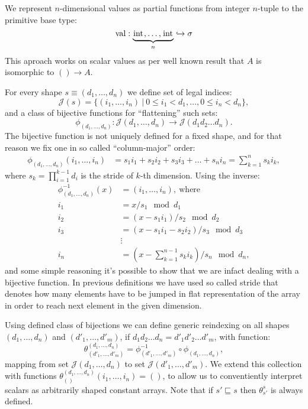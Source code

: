 \documentclass[a4paper, 10pt, draft]{report}
\newcommand{\mycode}[1]{\ensuremath{\mbox{\lstinline{#1}}}}
\begin{document}
We represent $n$-dimensional values as partial functions from integer $n$-tuple
to the primitive base type:
\[
  \operatorname{val} : \underbrace{\mycode{int},\ldots,\mycode{int}}_{n} \hookrightarrow \sigma
\]
This aproach works on scalar values as per well known result that $A$ is isomorphic to $() \to A$.

For every shape $s \equiv (d_1, \ldots, d_n)$ we define set of legal indices:
\[
  \mathcal{J}\!(s) = \{ (i_1, \ldots, i_n)\ |\ 0 \leq i_1 < d_1, \ldots, 0 \leq i_n < d_n \},
\]
and a class of bijective functions for ``flattening'' such sets:
\[
  \phi_{(d_1,\ldots,d_n)} : \mathcal{J}\!(d_1,\ldots,d_n) \to \mathcal{J}\!(d_1 d_2 \ldots d_n).
\]
The bijective function is not uniquely defined for a fixed shape, and for that
reason we fix one in so called ``column-major'' order:
\begin{align*}
  \phi_{(d_1,\ldots,d_n)}\!(i_1,\ldots,i_n) & = s_1 i_1 + s_2 i_2 + s_3 i_3 + \ldots + s_n i_n = \sum_{k = 1}^{n} s_k i_k,
\end{align*}
where $s_k = \prod_{i=1}^{k-1} d_i$ is the stride of $k$-th dimension. Using the inverse:
\begin{align*}
  \phi_{(d_1,\ldots,d_n)}^{-1}\!(x) & = (i_1, \ldots, i_n),\ \text{where} \\
                                i_1 & = x / s_1 \mod d_1 \\
                                i_2 & = (x - s_1 i_1) / s_2 \mod d_2 \\
                                i_3 & = (x - s_1 i_1 - s_2 i_2) / s_3 \mod d_3 \\
                                    & \vdots \\
                                i_n & = (x - \sum_{k = 1}^{n-1} s_k i_k) / s_n \mod d_n,
\end{align*}
and some simple reasoning it's possible to show that we are infact dealing with
a bijective function. In previous definitions we have used so called stride
that denotes how many elements have to be jumped in flat representation of the
array in order to reach next element in the given dimension.

Using defined class of bijections we can define generic reindexing on
all shapes $(d_1,\ldots,d_n)$ and $(d'_1,\ldots,d'_m)$, if $d_1 d_2 \ldots d_n
= d'_1 d'_2 \ldots d'_m$, with function:
\[
  \theta_{(d'_1, \ldots, d'_m)}^{(d_1, \ldots, d_n)} = \phi_{(d'_1, \ldots, d'_m)}^{-1} \circ \phi_{(d_1, \ldots, d_n)},
\]
mapping from set $\mathcal{J}\!(d_1, \ldots, d_n)$ to set
$\mathcal{J}\!(d'_1,\ldots,d'_m)$. We extend this collection with functions
$\theta_{()}^{(d_1,\ldots,d_n)}(i_1, \ldots, i_n) = ()$, to allow us to
conventiently interpret scalars as arbitrarily shaped constant arrays. Note
that if $s' \sqsubseteq s$ then $\theta_{s'}^{s}$ is always defined.
\end{document}
